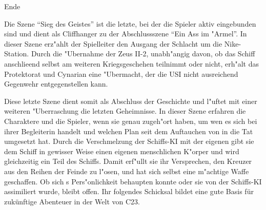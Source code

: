 \begin{remarks}
	\begin{center}\huge{}Ende\end{center}

	Die Szene "`Sieg des Geistes"' ist die letzte, bei der die Spieler aktiv eingebunden sind und dient als Cliffhanger zu der Abschlussszene "`Ein Ass im "Armel"'. In dieser Szene erz"ahlt der Spielleiter den Ausgang der Schlacht um die Nike-Station. Durch die "Ubernahme der Zeus II-2, unabh"angig davon, ob das Schiff anschlie\3end selbst am weiteren Kriegsgeschehen teilnimmt oder nicht, erh"alt das Protektorat und Cynarian eine "Ubermacht, der die USI nicht ausreichend Gegenwehr entgegenstellen kann.

	Diese letzte Szene dient somit als Abschluss der Geschichte und l"uftet mit einer weiteren "Uberraschung die letzten Geheimnisse. In dieser Szene erfahren die Charaktere und die Spieler, wenn sie genau zugeh"ort haben, um wen es sich bei ihrer Begleiterin handelt und welchen Plan \xl{} seit dem Auftauchen von \ml{} in die Tat umgesetzt hat. Durch die Verschmelzung der Schiffs-KI mit der eigenen gibt sie dem Schiff in gewisser Weise einen eigenen menschlichen K"orper und wird gleichzeitig ein Teil des Schiffs. Damit erf"ullt sie ihr Versprechen, den Kreuzer aus den Reihen der Feinde zu l"osen, und hat sich selbst eine m"achtige Waffe geschaffen. Ob sich \xl{}s Pers"onlichkeit behaupten konnte oder sie von der Schiffs-KI assimiliert wurde, bleibt offen. Ihr folgendes Schicksal bildet eine gute Basis für zukünftige Abenteuer in der Welt von C23.
\end{remarks}
\vfill\pagebreak